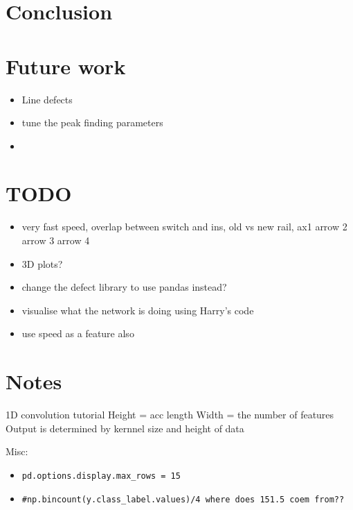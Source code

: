 \section{Conclusion}
\section{Future work}

\begin{itemize}
	\item Line defects
	\item tune the peak finding parameters
\end{itemize}

\begin{itemize}
	\item 
\end{itemize}


\newpage
\section{TODO}
\begin{itemize}
	\item very fast speed, overlap between switch and ins, old vs new rail, ax1 arrow 2 arrow 3 arrow 4
	\item 3D plots?
	\item change the defect library to use pandas instead?
	\item visualise what the network is doing using Harry's code
	\item use speed as a feature also
\end{itemize}


\newpage
\section{Notes}
1D convolution tutorial
Height = acc length
Width = the number of features
Output is determined by kernnel size and height of data

Misc:
\begin{itemize}
	\item \verb|pd.options.display.max_rows = 15|
	\item \verb|#np.bincount(y.class_label.values)/4 where does 151.5 coem from??|
\end{itemize}

